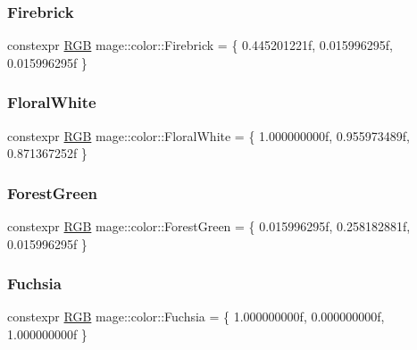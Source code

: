 \subsubsection{\texorpdfstring{Firebrick}{Firebrick}}
{\footnotesize\ttfamily constexpr \hyperlink{structmage_1_1_r_g_b}{R\+GB} mage\+::color\+::\+Firebrick = \{ 0.\+445201221f, 0.\+015996295f, 0.\+015996295f \}}

\hypertarget{namespacemage_1_1color_a1dd66768142140e9ee68a95e5981c44a}{}\label{namespacemage_1_1color_a1dd66768142140e9ee68a95e5981c44a} 
\subsubsection{\texorpdfstring{Floral\+White}{FloralWhite}}
{\footnotesize\ttfamily constexpr \hyperlink{structmage_1_1_r_g_b}{R\+GB} mage\+::color\+::\+Floral\+White = \{ 1.\+000000000f, 0.\+955973489f, 0.\+871367252f \}}

\hypertarget{namespacemage_1_1color_a9b90455f4354a6d6963486c472bc33be}{}\label{namespacemage_1_1color_a9b90455f4354a6d6963486c472bc33be} 
\subsubsection{\texorpdfstring{Forest\+Green}{ForestGreen}}
{\footnotesize\ttfamily constexpr \hyperlink{structmage_1_1_r_g_b}{R\+GB} mage\+::color\+::\+Forest\+Green = \{ 0.\+015996295f, 0.\+258182881f, 0.\+015996295f \}}

\hypertarget{namespacemage_1_1color_a5a36bb041d4344c2111b15294ba0d15f}{}\label{namespacemage_1_1color_a5a36bb041d4344c2111b15294ba0d15f} 
\subsubsection{\texorpdfstring{Fuchsia}{Fuchsia}}
{\footnotesize\ttfamily constexpr \hyperlink{structmage_1_1_r_g_b}{R\+GB} mage\+::color\+::\+Fuchsia = \{ 1.\+000000000f, 0.\+000000000f, 1.\+000000000f \}}

\hypertarget{namespacemage_1_1color_a1caedc498561f07c9ee98360cd32e0cf}{}\label{namespacemage_1_1color_a1caedc498561f07c9ee98360cd32e0cf} 
